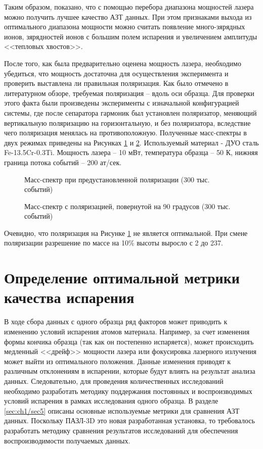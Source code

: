 Таким образом, показано, что с помощью перебора диапазона мощностей лазера можно получить лучшее качество АЗТ данных. При этом признаками выхода из оптимального диапазона мощности можно считать появление много-зярядных ионов, зярядностей ионов с большим полем испарения и увеличением амплитуды <<тепловых хвостов>>.

После того, как была предварительно оценена мощность лазера, необходимо убедиться, что мощность достаточна для осуществления эксперимента и проверить выставлена ли правильная поляризация. Как было отмечено в литературном обзоре, требуемая поляризация – вдоль оси образца. Для проверки этого факта были произведены эксперименты с изначальной конфигурацией системы, где после сепаратора гармоник был установлен поляризатор, меняющий вертикальную поляризацию на горизонтальную, и без поляризатора, вследствие чего поляризация менялась на противоположную. Полученные масс-спектры в двух режимах приведены на Рисунках \cref{fig:Oleg_polarize_ini} и \cref{fig:Oleg_polarize_final}. Используемый материал - ДУО сталь Fe-13.5Cr-0.3Ti. Мощность лазера – 10 мВт, температура образца – 50 К, нижняя граница потока событий – 200 ат/сек.

\begin{figure}[htb]
	\caption{Масс-спектр при предустановленной поляризации (300 тыс. событий)}
	\label{fig:Oleg_polarize_ini}
\end{figure}

\begin{figure}[htb]
	\caption{Масс-спектр с поляризацией, повернутой на 90 градусов (300 тыс. событий)}
	\label{fig:Oleg_polarize_final}
\end{figure}

Очевидно, что поляризация на Рисунке \cref{fig:Oleg_polarize_ini} не является оптимальной. При смене поляризации разрешение по массе на 10\% высоты выросло с 2 до 237.

\FloatBarrier

\section{Определение оптимальной метрики качества испарения}\label{sec:ch3/sect4}

В ходе сбора данных с одного образца ряд факторов может приводить к изменению условий испарения атомов материала. Например, за счет изменения формы кончика образца (так как он постепенно испаряется), может происходить медленный <<дрейф>>  мощности лазера или фокусировка лазерного излучения может выйти из оптимального положения. Данные изменения приводят к различным отклонениям в испарении, которые будут влиять на результат анализа данных. Следовательно, для проведения количественных исследований необходимо разработать методику поддержания постоянных и воспроизводимых условий испарения в рамках исследования одного образца. В разделе \cref{sec:ch1/sec5} описаны основные используемые метрики для сравнения АЗТ данных. Поскольку ПАЗЛ-3D это новая разработанная установка, то требовалось разработать методику сравнения результатов исследований для обеспечения воспроизводимости получаемых данных.

